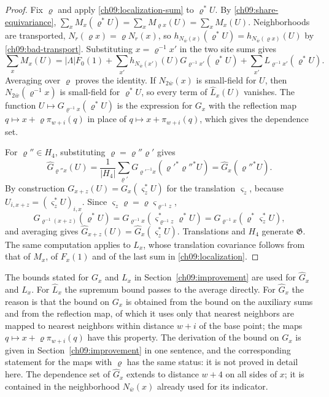 \begin{proof}
Fix $\varrho$ and apply \eqref{ch09:localization-sum} to $\varrho^*U$.
By \eqref{ch09:share-equivariance},
$\sum_xM_x(\varrho^*U)=\sum_xM_{\varrho x}(U)=\sum_xM_x(U)$.
Neighborhoods are transported, $N_r(\varrho x)=\varrho N_r(x)$, so
$h_{N_{\bar w}(x)}(\varrho^*U)=h_{N_{\bar w}(\varrho x)}(U)$ by
\eqref{ch09:bad-transport}. Substituting $x=\varrho^{-1}x'$ in the two
site sums gives
\[
 \sum_xM_x(U)=|\Lambda|F_0(1)
  +\sum_{x'}h_{N_{\bar w}(x')}(U)G_{\varrho^{-1}x'}(\varrho^*U)
  +\sum_{x'}L_{\varrho^{-1}x'}(\varrho^*U).
\]
Averaging over $\varrho$ proves the identity. If $N_{2\bar w}(x)$ is
small-field for $U$, then $N_{2\bar w}(\varrho^{-1}x)$ is small-field
for $\varrho^*U$, so every term of $\widehat L_x(U)$ vanishes. The
function $U\mapsto G_{\varrho^{-1}x}(\varrho^*U)$ is the expression for
$G_x$ with the reflection map $q\mapsto x+\varrho\pi_{w+i}(q)$ in place of
$q\mapsto x+\pi_{w+i}(q)$, which gives the dependence set.

For $\varrho''\in H_4$, substituting $\varrho=\varrho''\varrho'$ gives
\[
 \widehat G_{\varrho''x}(U)=\frac1{|H_4|}\sum_{\varrho'}
        G_{\varrho'^{-1}x}(\varrho'^*\varrho''^*U)
                   =\widehat G_x(\varrho''^*U).
\]
By construction $G_{x+z}(U)=G_x(\varsigma_z^*U)$ for the translation
$\varsigma_z$, because $U_{i,x+z}=(\varsigma_z^*U)_{i,x}$.
Since $\varsigma_z\varrho=\varrho\varsigma_{\varrho^{-1}z}$,
\[
 G_{\varrho^{-1}(x+z)}(\varrho^*U)
   =G_{\varrho^{-1}x}(\varsigma_{\varrho^{-1}z}^*\varrho^*U)
   =G_{\varrho^{-1}x}(\varrho^*\varsigma_z^*U),
\]
and averaging gives
$\widehat G_{x+z}(U)=\widehat G_x(\varsigma_z^*U)$.
Translations and $H_4$ generate $\mathfrak G$. The same computation
applies to $L_x$, whose translation covariance follows from that of
$M_x$, of $F_x(1)$ and of the last sum in \eqref{ch09:localization}.
\end{proof}

The bounds stated for $G_x$ and $L_x$ in
Section~\ref{ch09:improvement} are used for $\widehat G_x$ and
$\widehat L_x$. For $\widehat L_x$ the supremum bound passes to the
average directly. For $\widehat G_x$ the reason is that the bound on
$G_x$ is obtained from the bound on the auxiliary sums and from the
reflection map, of which it uses only that nearest neighbors are mapped
to nearest neighbors within distance $w+i$ of the base point; the maps
$q\mapsto x+\varrho\pi_{w+i}(q)$ have this property. The derivation of
the bound on $G_x$ is given in Section~\ref{ch09:improvement} in one
sentence, and the corresponding statement for the maps with $\varrho$
has the same status: it is not proved in detail here. The
dependence set of $\widehat G_x$ extends to distance $w+4$ on all
sides of $x$; it is contained in the neighborhood $N_{\bar w}(x)$
already used for its indicator.

